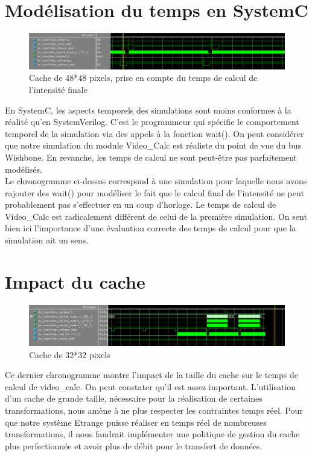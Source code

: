 \documentclass[a4paper,12pt]{report}
\begin{document}
{{{	\section{Modélisation du temps en SystemC}
	\begin{figure}[!h]
		\centering
		\includegraphics[scale = 0.33]{wave_reduced.png}
	\caption{Cache de 48*48 pixels, prise en compte du temps de calcul de l'intensité finale}
	\end{figure}
	En SystemC, les aspects temporels des simulations sont moins conformes à la réalité qu'en SystemVerilog. 
	C'est le programmeur qui spécifie le comportement temporel de la simulation via des appels à la fonction wait().
	On peut considérer que notre simulation du module Video\_Calc est réaliste du point de vue du bus Wishbone. 
	En revanche, les temps de calcul ne sont peut-être pas parfaitement modélisés.\\
	Le chronogramme ci-dessus correspond à une simulation pour laquelle nous avons rajouter des wait() pour modéliser le fait que le calcul final de l'intensité ne peut probablement pas s'effectuer en un coup d'horloge.
	Le temps de calcul de Video\_Calc est radicalement différent de celui de la première simulation.
	On sent bien ici l'importance d'une évaluation correcte des temps de calcul pour que la simulation ait un sens.
	
	\section{Impact du cache}
	\begin{figure}[!h]
		\centering
		\includegraphics[scale = 0.33]{wave_cache32_reduced.png}
	\caption{Cache de 32*32 pixels}
	\end{figure}
	Ce dernier chronogramme montre l'impact de la taille du cache sur le temps de calcul de video\_calc. On peut constater qu'il est assez important.
	L'utilisation d'un cache de grande taille, nécessaire pour la réalisation de certaines transformations, nous amène à ne plus respecter les contraintes temps réel. 
	Pour que notre système Etrange puisse réaliser en temps réel de nombreuses transformations, il nous faudrait implémenter une politique de gestion du cache plus 
	perfectionnée et avoir plus de débit pour le transfert de données. 
	




}}}
\end{document}
